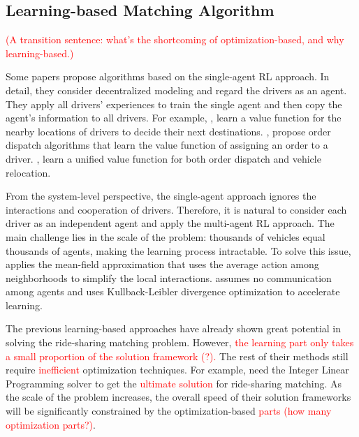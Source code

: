 \documentclass[sigconf]{acmart}
\newcommand{\tcr}[1]{{\textcolor{red}{#1}}}
\begin{document}
\subsection{Learning-based Matching Algorithm}

\tcr{(A transition sentence: what's the shortcoming of optimization-based, and why learning-based.)}

Some papers \cite{??} propose algorithms based on the single-agent RL approach.
In detail, they consider decentralized modeling and regard the drivers
as an agent. They apply all drivers' experiences to train the single
agent and then copy the agent's information to all drivers. For example,
\cite{tang2019deep}, \cite{al2019deeppool} learn a value function
for the nearby locations of drivers to decide their next destinations.
\cite{wang2018deep}, \cite{xu2018large} propose order dispatch algorithms
that learn the value function of assigning an order to a driver. \cite{holler2019deep},
\cite{tang2021value} learn a unified value function for both order
dispatch and vehicle relocation. 

From the system-level perspective, the single-agent approach ignores
the interactions and cooperation of drivers. Therefore, it is natural
to consider each driver as an independent agent and apply the multi-agent
RL approach. The main challenge lies in the scale of the problem:
thousands of vehicles equal thousands of agents, making the learning
process intractable. To solve this issue, \cite{li2019efficient}
applies the mean-field approximation that uses the average action
among neighborhoods to simplify the local interactions. \cite{zhou2019multi}
assumes no communication among agents and uses Kullback-Leibler divergence
optimization to accelerate learning. 

The previous learning-based approaches have already shown great potential
in solving the ride-sharing matching problem. However, \tcr{the learning part only takes a small proportion of the solution framework (?).} 
The rest of their methods still require \tcr{inefficient} optimization techniques.
For example, \cite{xu2018large,shah2020neural,tang2021value} need
the Integer Linear Programming solver to get the \tcr{ultimate solution}
for ride-sharing matching. As the scale of the problem increases,
the overall speed of their solution frameworks will be significantly
constrained by the optimization-based \tcr{parts (how many optimization parts?)}. 
\end{document}
